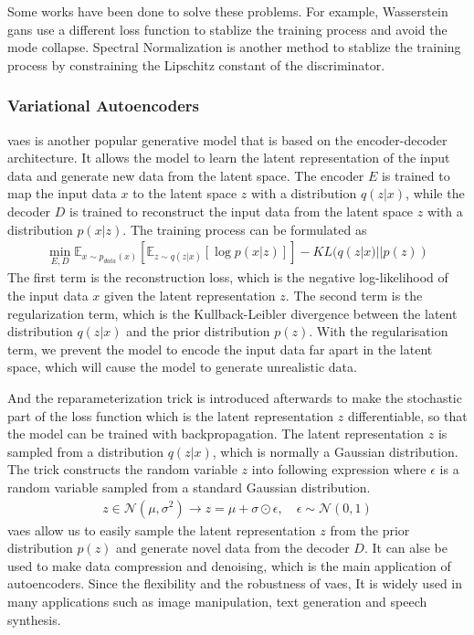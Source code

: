 \documentclass[12pt,DIV14,BCOR12mm,a4paper,footinclude=false,headinclude,parskip=half-,twoside,openright,cleardoublepage=empty,toc=index,bibliography=totoc,listof=totoc]{scrreprt}
\numberwithin{equation}{chapter}
\begin{document}
Some works have been done to solve these problems. For example, Wasserstein \glspl{gan}\cite{arjovsky2017wasserstein} use a different loss function to stablize the training process and avoid the mode collapse. Spectral Normalization\cite{miyato2018spectral} is another method to stablize the training process by constraining the Lipschitz constant of the discriminator.
\subsubsection{Variational Autoencoders}
\glspl{vae}\cite{kingma2022autoencoding} is another popular generative model that is based on the encoder-decoder architecture. It allows the model to learn the latent representation of the input data and generate new data from the latent space. The encoder $E$ is trained to map the input data $x$ to the latent space $z$ with a distribution $q(z|x)$, while the decoder $D$ is trained to reconstruct the input data from the latent space $z$ with a distribution $p(x|z)$. The training process can be formulated as
\begin{align}
  \min_{E,D} \mathbb{E}_{x\sim p_{data}(x)}[\mathbb{E}_{z\sim q(z|x)}[\log p(x|z)]] - KL(q(z|x)||p(z))
\end{align}
The first term is the reconstruction loss, which is the negative log-likelihood of the input data $x$ given the latent representation $z$. The second term is the regularization term, which is the Kullback-Leibler divergence between the latent distribution $q(z|x)$ and the prior distribution $p(z)$. With the regularisation term, we prevent the model to encode the input data far apart in the latent space, which will cause the model to generate unrealistic data.

And the reparameterization trick\cite{kingma2015variational} is introduced afterwards to make the stochastic part of the loss function which is the latent representation $z$ differentiable, so that the model can be trained with backpropagation. The latent representation $z$ is sampled from a distribution $q(z|x)$, which is normally a Gaussian distribution. The trick constructs the random variable $z$ into following expression where $\epsilon$ is a random variable sampled from a standard Gaussian distribution.
\begin{align}
  z \in \mathcal{N} (\mu, \sigma^{2}) \longrightarrow z = \mu + \sigma \odot \epsilon, \quad \epsilon \sim \mathcal{N} (0, 1)
\end{align}
\glspl{vae} allow us to easily sample the latent representation $z$ from the prior distribution $p(z)$ and generate novel data from the decoder $D$. It can alse be used to make data compression and denoising, which is the main application of autoencoders. Since the flexibility and the robustness of \glspl{vae}, It is widely used in many applications such as image manipulation, text generation and speech synthesis.
\end{document}
